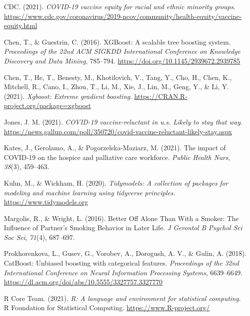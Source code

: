 \documentclass[
  12pt,
]{article}
\newlength{\cslhangindent}
\newlength{\cslentryspacingunit} %
\newenvironment{CSLReferences}[2] %
 {%
  \setlength{\parindent}{0pt}
  \ifodd #1
  \let\oldpar\par
  \def\par{\hangindent=\cslhangindent\oldpar}
  \fi
  \setlength{\parskip}{#2\cslentryspacingunit}
 }%
 {}
\begin{document}
\hypertarget{refs}{}
\begin{CSLReferences}{1}{0}
\leavevmode{}%
CDC. (2021). \emph{COVID-19 vaccine equity for racial and ethnic
minority groups}.
\url{https://www.cdc.gov/coronavirus/2019-ncov/community/health-equity/vaccine-equity.html}

\leavevmode{}%
Chen, T., \& Guestrin, C. (2016). XGBoost: A scalable tree boosting
system. \emph{Proceedings of the 22nd ACM SIGKDD International
Conference on Knowledge Discovery and Data Mining}, 785--794.
\url{https://doi.org/10.1145/2939672.2939785}

\leavevmode{}%
Chen, T., He, T., Benesty, M., Khotilovich, V., Tang, Y., Cho, H., Chen,
K., Mitchell, R., Cano, I., Zhou, T., Li, M., Xie, J., Lin, M., Geng,
Y., \& Li, Y. (2021). \emph{Xgboost: Extreme gradient boosting}.
\url{https://CRAN.R-project.org/package=xgboost}

\leavevmode{}%
Jones, J. M. (2021). \emph{COVID-19 vaccine-reluctant in u.s. Likely to
stay that way}.
\url{https://news.gallup.com/poll/350720/covid-vaccine-reluctant-likely-stay.aspx}

\leavevmode{}%
Kates, J., Gerolamo, A., \& Pogorzelska-Maziarz, M. (2021). {{T}he
impact of {C}{O}{V}{I}{D}-19 on the hospice and palliative care
workforce}. \emph{Public Health Nurs}, \emph{38}(3), 459--463.

\leavevmode{}%
Kuhn, M., \& Wickham, H. (2020). \emph{Tidymodels: A collection of
packages for modeling and machine learning using tidyverse principles.}
\url{https://www.tidymodels.org}

\leavevmode{}%
Margolis, R., \& Wright, L. (2016). {{B}etter {O}ff {A}lone {T}han
{W}ith a {S}moker: {T}he {I}nfluence of {P}artner's {S}moking {B}ehavior
in {L}ater {L}ife}. \emph{J Gerontol B Psychol Sci Soc Sci},
\emph{71}(4), 687--697.

\leavevmode{}%
Prokhorenkova, L., Gusev, G., Vorobev, A., Dorogush, A. V., \& Gulin, A.
(2018). CatBoost: Unbiased boosting with categorical features.
\emph{Proceedings of the 32nd International Conference on Neural
Information Processing Systems}, 6639--6649.
\url{https://dl.acm.org/doi/abs/10.5555/3327757.3327770}

\leavevmode{}%
R Core Team. (2021). \emph{R: A language and environment for statistical
computing}. R Foundation for Statistical Computing.
\url{https://www.R-project.org/}


\end{CSLReferences}
\end{document}
